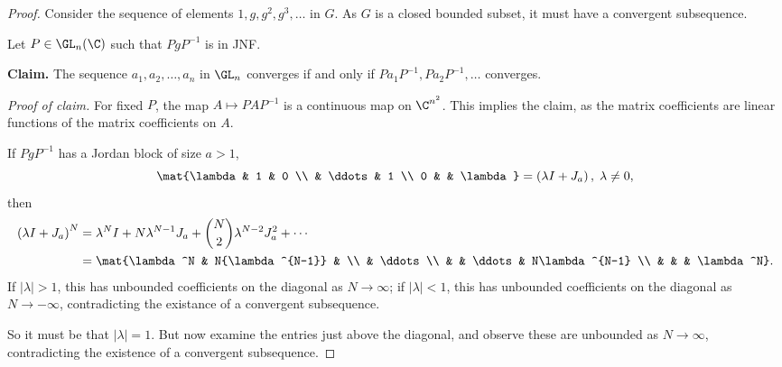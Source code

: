 \begin{proof}
	Consider the sequence of elements $1,g,g^2,g^3,\ldots$ in $G$. As $G$ is a closed bounded subset, it must have a convergent subsequence. %
	
	Let $P\in\GL_n(\C)$ such that $PgP^{-1}$ is in JNF.
	
	\textbf{Claim.} The sequence $a_1,a_2,\ldots,a_n$ in $\GL_n$ converges if and only if $Pa_1 P^{-1},P a_2 P^{-1},\ldots$ converges. %
	
	\emph{Proof of claim.} For fixed $P$, the map $A\mapsto PAP^{-1}$ is a continuous map on $\C^{n^2}$. This implies the claim, as the matrix coefficients are linear functions of the matrix coefficients on $A$. %
	
	If $PgP^{-1}$ has a Jordan block of size $a>1$,
	\begin{equation*}
		\mat{\lambda & 1 & 0 \\ & \ddots & 1 \\ 0 & & \lambda}=\left( \lambda I+J_a \right), \; \lambda\neq 0,
	\end{equation*}
	then
	\begin{align*}
		\left( \lambda I+J_a \right)^N
		&= \lambda^N I + N\lambda^{N-1} J_a + {N \choose 2} \lambda^{N-2} J_a^2 + \cdots \\
		&= \mat{\lambda^N & N{\lambda^{N-1}} & \\ & \ddots \\ & & \ddots & N\lambda^{N-1} \\ & & & \lambda^N}. %
	\end{align*}
	If $|\lambda| > 1$,  this has unbounded coefficients on the diagonal as $N \to \infty$;  if  $|\lambda| < 1$,  this has unbounded coefficients on the diagonal as $N \to - \infty$, contradicting the existance of a convergent subsequence. %

	So it must be that $|\lambda| =1 $. But now examine the entries just above the diagonal, and observe these are unbounded as $N \to \infty$, contradicting the existence of a convergent subsequence. %
\end{proof}

